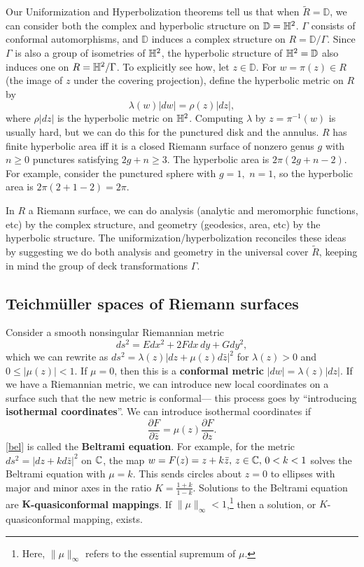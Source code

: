 Our Uniformization and Hyperbolization theorems tell us that when $\widetilde R=\mathbb D$, we can consider both the complex and hyperbolic structure on $\mathbb D=\mathbb{H}^2$. $\Gamma$ consists of conformal automorphisms, and $\mathbb D$ induces a complex structure on $R = \mathbb D / \Gamma$. Since $\Gamma$ is also a group of isometries of $\mathbb{H}^2$, the hyperbolic structure of $\mathbb{H}^2=\mathbb D$ also induces one on $R=\mathbb{H}^2 / \Gamma$. To explicitly see how, let $z \in \mathbb D$. For $w=\pi(z) \in R$ (the image of $z$ under the covering projection), define the hyperbolic metric on $R$ by \[
    \lambda(w)|dw|=\rho(z)|dz|,
\] where $\rho |dz|$ is the hyperbolic metric on $\mathbb {\mathbb{H}}^2$. Computing $\lambda$ by $z= \pi ^{-1}(w)$ is usually hard, but we can do this for the punctured disk and the annulus. $R$ has finite hyperbolic area iff it is a closed Riemann surface of nonzero genus $g$ with $n\geq 0$ punctures satisfying $2g+n\geq 3$. The hyperbolic area is $2\pi (2g+n-2)$. For example, consider the punctured sphere with $g=1,$ $n=1$, so the hyperbolic area is $2\pi(2+1-2)=2\pi$.

In $R$ a Riemann surface, we can do analysis (analytic and meromorphic functions, etc) by the complex structure, and geometry (geodesics, area, etc) by the hyperbolic structure. The uniformization/hyperbolization reconciles these ideas by suggesting we do both analysis and geometry in the universal cover $\widetilde R$, keeping in mind the group of deck transformations $\Gamma$.

\subsection{Teichm\"uller spaces of Riemann surfaces}
Consider a smooth nonsingular Riemannian metric \[
ds ^2=E dx^2+2F dx\,dy+G dy^2,
\] which we can rewrite as $ds ^2=\lambda(z)|dz+\mu(z)d \bar{z}|^2$ for $\lambda(z)>0$ and $0 \leq |\mu(z)| <1$. If $\mu=0$, then this is a \textbf{conformal metric} $|dw|=\lambda(z)|dz|$. If we have a Riemannian metric, we can introduce new local coordinates on a surface such that the new metric is conformal--- this process goes by ``introducing \textbf{isothermal coordinates}''. We can introduce isothermal coordinates if 
\begin{equation}\label{bel} 
\frac{\partial F}{\partial \bar z}=\mu(z) \frac{\partial F}{\partial z}.
\end{equation}\cref{bel} is called the \textbf{Beltrami equation}. 
    For example, for the metric $ds ^2=|dz +k d \bar z |^2$ on $\mathbb{C}$, the map $w=F(z)=z+k \bar z,\, z \in \mathbb{C},\, 0 <k<1$ solves the Beltrami equation with $\mu=k$. This sends circles about $z=0$ to ellipses with major and minor axes in the ratio $K=\frac{1+k}{1-k}$. Solutions to the Beltrami equation are $\mathbf K$\textbf{-quasiconformal mappings}. If $\|\mu\|_{\infty}<1$,\footnote{Here, $\|\mu\|_{\infty}$ refers to the essential supremum of $\mu$.} then a solution, or $K$-quasiconformal mapping, exists.

